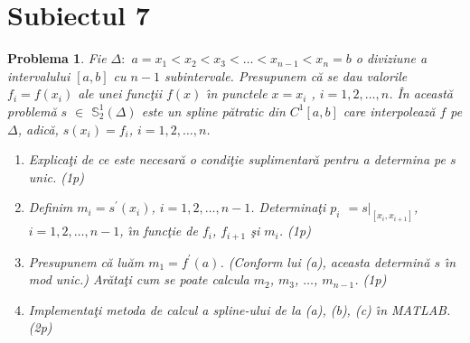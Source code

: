 \documentclass{article}%
\newtheorem{problem}[theorem]{Problema}
\begin{document}
\section*{Subiectul 7}

\begin{problem}
\label{Gautschip2.73}Fie $\Delta:$ $a=x_{1}<x_{2}<x_{3}<\dots<x_{n-1}<x_{n}=b$
o diviziune a intervalului $[a,b]$ cu $n-1$ subintervale. Presupunem c\u{a} se
dau valorile $f_{i}=f(x_{i})$ ale unei func\c{t}ii $f(x)$ \^{\i}n punctele
$x=x_{i}$ , $i=1,2,\dots,n$. \^{I}n aceast\u{a} problem\u{a} $s$ $\in$
$\mathbb{S}_{2}^{1}(\Delta)$ este un spline p\u{a}tratic din $C^{1}[a,b]$ care
interpoleaz\u{a} $f$ pe $\Delta$, adic\u{a}, $s(x_{i})=f_{i}$, $i=1,2,\dots,n$.

\begin{enumerate}
\item[(a)] Explica\c{t}i de ce este necesar\u{a} o condi\c{t}ie
suplimentar\u{a} pentru a determina pe $s$ unic. (1p)

\item[(b)] Definim $m_{i}=s^{\prime}(x_{i})$, $i=1,2,\dots,n-1$.
Determina\c{t}i $p_{i}$ $=\left.  s\right\vert _{[x_{i},x_{i+1}]}$,
$i=1,2,\dots,n-1$, \^{\i}n func\c{t}ie de $f_{i}$, $f_{i+1}$ \c{s}i $m_{i}$. (1p)

\item[(c)] Presupunem c\u{a} lu\u{a}m $m_{1}=f^{\prime}(a)$. (Conform lui (a),
aceasta determin\u{a} $s$ \^{\i}n mod unic.) Ar\u{a}ta\c{t}i cum se poate
calcula $m_{2}$, $m_{3}$, $\dots$, $m_{n-1}$. (1p)

\item[(d)] Implementa\c{t}i metoda de calcul a spline-ului de la (a), (b), (c)
\^{\i}n MATLAB. (2p)
\end{enumerate}
\end{problem}
\end{document}
